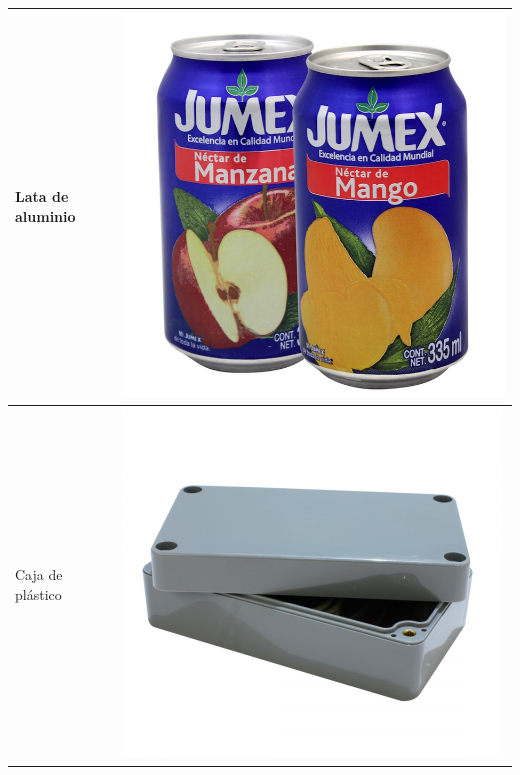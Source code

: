 \documentclass[11pt,twocolumn,letterpaper,spanish]{article}
\begin{document}
\begin{table}[hbt!]
\begin{tabular}{ m{6cm}  m{3.5cm} }
      Lata de aluminio & \includegraphics[align=t,scale=0.08]{Materiales/lata}\\
      \hline
      Caja de plástico & \includegraphics[align=t,scale=0.16]{Materiales/cajita1}\\
      \hline

\end{tabular}
\end{table}
\end{document}

